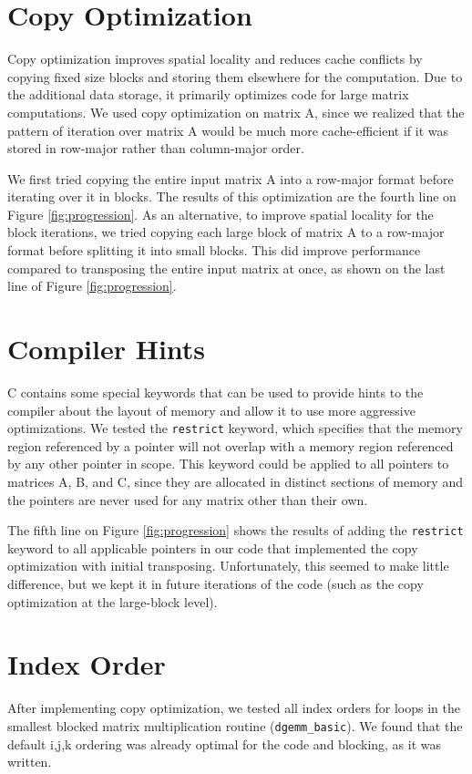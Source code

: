 \documentclass[letterpaper]{article}	 %
\begin{document}
\section{Copy Optimization}
Copy optimization improves spatial locality and reduces cache conflicts by copying fixed size blocks and storing them elsewhere for the computation. Due to the additional data storage, it primarily optimizes code for large matrix computations. We used copy optimization on matrix A, since we realized that the pattern of iteration over matrix A would be much more cache-efficient if it was stored in row-major rather than column-major order.

We first tried copying the entire input matrix A into a row-major format before iterating over it in blocks. The results of this optimization are the fourth line on Figure \ref{fig:progression}. As an alternative, to improve spatial locality for the block iterations, we tried copying each large block of matrix A to a row-major format before splitting it into small blocks. This did improve performance compared to transposing the entire input matrix at once, as shown on the last line of Figure \ref{fig:progression}.

\section{Compiler Hints}
C contains some special keywords that can be used to provide hints to the compiler about the layout of memory and allow it to use more aggressive optimizations. We tested the \texttt{restrict} keyword, which specifies that the memory region referenced by a pointer will not overlap with a memory region referenced by any other pointer in scope. This keyword could be applied to all pointers to matrices A, B, and C, since they are allocated in distinct sections of memory and the pointers are never used for any matrix other than their own.

The fifth line on Figure \ref{fig:progression} shows the results of adding the \texttt{restrict} keyword to all applicable pointers in our code that implemented the copy optimization with initial transposing. Unfortunately, this seemed to make little difference, but we kept it in future iterations of the code (such as the copy optimization at the large-block level).

\section{Index Order}
After implementing copy optimization, we tested all index orders for loops in the smallest blocked matrix multiplication routine (\texttt{dgemm\_basic}). We found that the default i,j,k ordering was already optimal for the code and blocking, as it was written.
\end{document}
